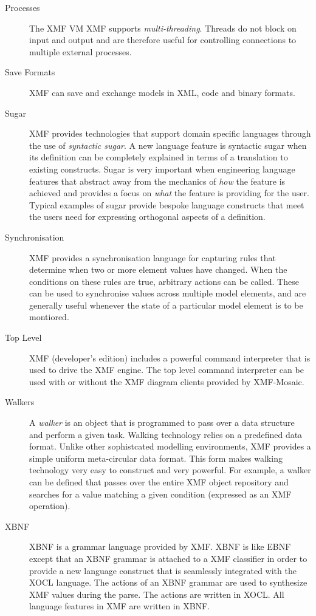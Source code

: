 \documentclass{article}
\begin{document}
\begin{description}
\item[Processes]
The XMF VM XMF supports {\em multi-threading}. Threads do not block on input and 
output and are therefore useful for controlling connections to multiple
external processes.

\item[Save Formats]
XMF can save  and exchange models in XML, code and binary formats.

\item[Sugar]
XMF provides technologies that support domain specific languages through the use
of {\em syntactic sugar}. A new language feature is syntactic sugar when its
definition can be completely explained in terms of a translation to existing 
constructs. Sugar is very important when engineering language features that
abstract away from the mechanics of {\em how} the feature is achieved and provides
a focus on {\em what} the feature is providing for the user. Typical examples
of sugar provide bespoke language constructs that meet the users need for
expressing orthogonal aspects of a definition.

\item[Synchronisation]
XMF provides a synchronisation language for capturing rules that determine
when two or more element values have changed. When the conditions on these
rules are true, arbitrary actions can be called. These can be used to 
synchronise values across multiple model elements, and are generally useful
whenever the state of a particular model element is to be montiored.

\item[Top Level]
XMF (developer's edition) includes a powerful command interpreter that is used
to drive the XMF engine. The top level command interpreter can be used with or
without the XMF diagram clients provided by XMF-Mosaic.

\item[Walkers]
A {\em walker} is an object that is programmed to pass over a data structure and 
perform a given task. Walking technology relies on a predefined data format. Unlike
other sophistcated modelling environments, XMF provides a simple uniform meta-circular
data format. This form makes walking technology very easy to construct and very 
powerful. For example, a walker can be defined that passes over the entire XMF
object repository and searches for a value matching a given condition (expressed 
as an XMF operation).

\item[XBNF]
XBNF is a grammar language provided by XMF. XBNF is like EBNF except that an XBNF
grammar is attached to a XMF classifier in order to provide a new language construct 
that is seamlessly integrated with the XOCL language. The actions of an XBNF grammar
are used to synthesize XMF values during the parse. The actions are written in XOCL.
All language features in XMF are written in XBNF.


\end{description}
\end{document}
